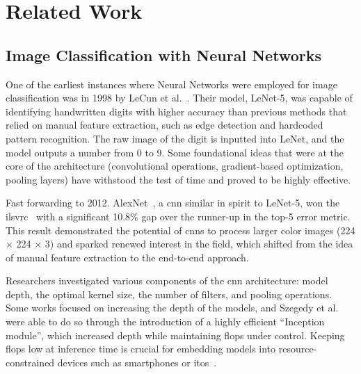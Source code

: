 \chapter{Related Work}
\label{ch:related-work}

\section{Image Classification with Neural Networks}
\label{sec:image-classification-with-neural-networks}

One of the earliest instances where Neural Networks were employed for image classification was in 1998 by LeCun et al.~\cite{GradientBasedLecun1998}. Their model, LeNet-5, was capable of identifying handwritten digits with higher accuracy than previous methods that relied on manual feature extraction, such as edge detection and hardcoded pattern recognition. The raw image of the digit is inputted into LeNet, and the model outputs a number from 0 to 9.
Some foundational ideas that were at the core of the architecture (convolutional operations, gradient-based optimization, pooling layers) have withstood the test of time and proved to be highly effective.

Fast forwarding to 2012. AlexNet~\cite{ImagenetClassiKrizhe2017}, a \acrfull{cnn} similar in spirit to LeNet-5, won the \acrfull{ilsvrc}~\cite{ImagenetLargeRussak2014} with a significant 10.8\% gap over the runner-up in the top-5 error metric. This result demonstrated the potential of \acrshort{cnn}s to process larger color images (224 × 224 × 3) and sparked renewed interest in the field, which shifted from the idea of manual feature extraction to the end-to-end approach.

Researchers investigated various components of the \acrshort{cnn} architecture: model depth, the optimal kernel size, the number of filters, and pooling operations. Some works \cite{VeryDeepConvoSimony2014, GoingDeeperWiSzeged2014} focused on increasing the depth of the models, and Szegedy et al.~\cite{GoingDeeperWiSzeged2014} were able to do so through the introduction of a highly efficient ``Inception module'', which increased depth while maintaining \acrfull{flops} under control. Keeping \acrshort{flops} low at inference time is crucial for embedding models into resource-constrained devices such as smartphones or \acrfull{itos}~\cite{SqueezenetAleIandol2016, MnasnetPlatfoTanM2018, MobilenetsEffHoward2017}.

